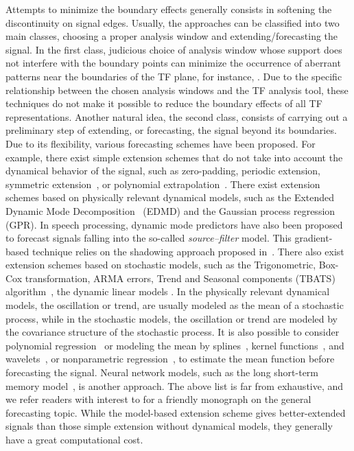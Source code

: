 \documentclass[journal]{IEEEtran}
\begin{document}
Attempts to minimize the boundary effects generally consists in softening the discontinuity on signal edges. Usually, the approaches can be classified into two main classes, choosing a proper analysis window and extending/forecasting the signal. In the first class, judicious choice of analysis window whose support does not interfere with the boundary points can minimize the occurrence of aberrant patterns near the boundaries of the TF plane, for instance, \cite{Chui92wavelets,Depczynski99fast}. Due to the specific relationship between the chosen analysis windows and the TF analysis tool, these techniques do not make it possible to reduce the boundary effects of all TF representations. 
%
Another natural idea, the second class, consists of carrying out a preliminary step of extending, or forecasting, the signal beyond its boundaries. Due to its flexibility, various forecasting schemes have been proposed. For example, there exist simple extension schemes that do not take into account the dynamical behavior of the signal, such as zero-padding, periodic extension, symmetric extension~\cite{Kharitonenko02wavelet,Chen95symmetric}, or polynomial extrapolation~\cite{Williams97discrete}. 
%
There exist extension schemes based on physically relevant dynamical models, such as the Extended Dynamic Mode Decomposition~\cite{Williams15data} (EDMD) and the Gaussian process regression~\cite{Rasmussen06gaussian,Roberts13Gaussian} (GPR).
%
In speech processing, dynamic mode predictors have also been proposed~\cite{Vargas11speech} to forecast signals falling into the so-called \textit{source--filter} model. This gradient-based technique relies on the shadowing approach proposed in~\cite{Grebogi90shadowing}.
%
There also exist extension schemes based on stochastic models, such as the Trigonometric, Box-Cox transformation, ARMA errors, Trend and Seasonal components (TBATS) algorithm~\cite{DeLivera11forecasting}, the dynamic linear models \cite{west2006bayesian}. 
%
In the physically relevant dynamical models, the oscillation or trend, are usually modeled as the mean of a stochastic process, while in the stochastic models, the oscillation or trend are modeled by the covariance structure of the stochastic process. 
It is also possible to consider polynomial regression~\cite{fan1996local} or modeling the mean by splines~\cite{hall2005theory}, kernel functions~\cite{chang2010training}, and wavelets~\cite{marron1998exact}, or nonparametric regression~\cite{fan1996local}, to estimate the mean function before forecasting the signal. Neural network models, such as the long short-term memory model~\cite{vlachas2018data}, is another approach. 
%
The above list is far from exhaustive, and we refer readers with interest to \cite{hyndman2018forecasting} for a friendly monograph on the general forecasting topic. 
%
While the model-based extension scheme gives better-extended signals than those simple extension without dynamical models, they generally have a great computational cost. 
\end{document}
